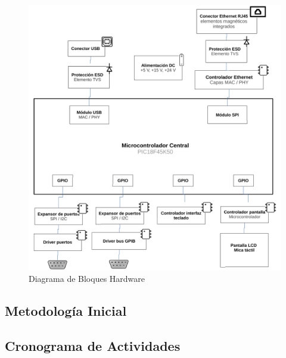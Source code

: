 \documentclass[paper=letter,oneside,fontsize=11pt, parskip=full]{scrartcl}
\begin{document}
	\begin{figure}[h!]
		\begin{center}
			\includegraphics[width=18cm]{Imagenes/DiagramaBloquesHardware2.pdf}
			\caption{Diagrama de Bloques Hardware}
			\label{Fig:Diagrama de Bloques de Hardware}
		\end{center}
	\end{figure}




	\subsection{Metodología Inicial}
	
	\subsection{Cronograma de Actividades}
	
\end{document}
